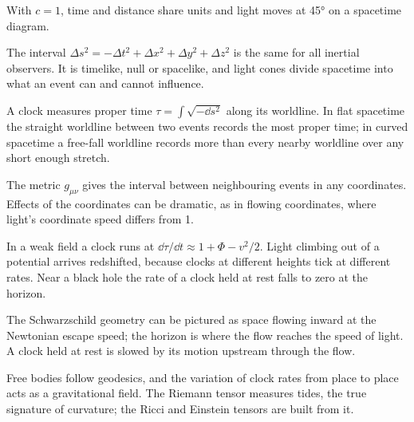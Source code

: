 \begin{chaptersummary}
\item With $c = 1$, time and distance share units and light moves at \ang{45}
  on a spacetime diagram.
\item The interval $\Delta s^{2} = -\Delta t^{2} + \Delta x^{2} + \Delta y^{2} + \Delta z^{2}$
  is the same for all inertial observers. It is timelike, null or spacelike,
  and light cones divide spacetime into what an event can and cannot
  influence.
\item A clock measures proper time $\tau = \int\sqrt{-\dd s^{2}}$ along its
  worldline. In flat spacetime the straight worldline between two events
  records the most proper time; in curved spacetime a free-fall worldline
  records more than every nearby worldline over any short enough stretch.
\item The metric $g_{\mu\nu}$ gives the interval between neighbouring events in
  any coordinates. Effects of the coordinates can be dramatic, as in flowing
  coordinates, where light's coordinate speed differs from 1.
\item In a weak field a clock runs at $\dd\tau/\dd t \approx 1 + \Phi - v^{2}/2$.
  Light climbing out of a potential arrives redshifted, because clocks at
  different heights tick at different rates. Near a black hole the rate of a
  clock held at rest falls to zero at the horizon.
\item The Schwarzschild geometry can be pictured as space flowing inward at the
  Newtonian escape speed; the horizon is where the flow reaches the speed of
  light. A clock held at rest is slowed by its motion upstream through the
  flow.
\item Free bodies follow geodesics, and the variation of clock rates from place
  to place acts as a gravitational field. The Riemann tensor measures tides,
  the true signature of curvature; the Ricci and Einstein tensors are built
  from it.
\end{chaptersummary}

